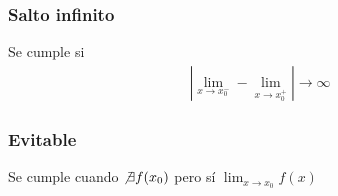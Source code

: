 \documentclass{article}
\begin{document}
\subsubsection{Salto infinito}
Se cumple si
\begin{equation}
    \begin{split}
        |\lim_{x \to x_{0}^{-}}-\lim_{x \to x_{0}^{+}}| \to \infty
    \end{split}
\end{equation}
\subsubsection{Evitable}
Se cumple cuando $\not \exists f(x_{0})$ pero sí $\lim_{x \to x_{0}}f(x)$
\end{document}

